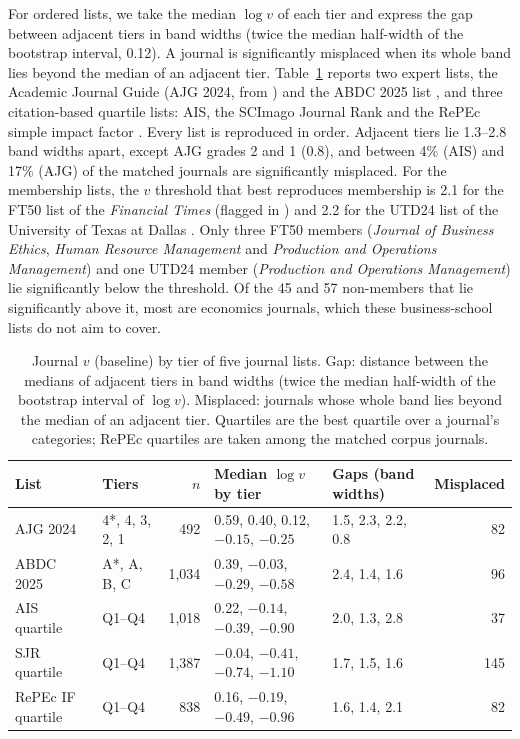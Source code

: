 For ordered lists, we take the median $\log v$ of each tier and express the gap between adjacent tiers in band widths (twice the median half-width of the bootstrap interval, 0.12). A journal is significantly misplaced when its whole band lies beyond the median of an adjacent tier. Table~\ref{tab:journal_tiers} reports two expert lists, the Academic Journal Guide (AJG 2024, from \citealp{harzingJournalQualityList2024}) and the ABDC 2025 list \citep{australianbusinessdeanscouncil2025ABDCJournal2025}, and three citation-based quartile lists: AIS, the SCImago Journal Rank \citep{scimagoSJR2025} and the RePEc simple impact factor \citep{repecRankings2026}. Every list is reproduced in order. Adjacent tiers lie 1.3--2.8 band widths apart, except AJG grades 2 and 1 (0.8), and between 4\% (AIS) and 17\% (AJG) of the matched journals are significantly misplaced. For the membership lists, the $v$ threshold that best reproduces membership is 2.1 for the FT50 list of the \textit{Financial Times} (flagged in \citealp{harzingJournalQualityList2024}) and 2.2 for the UTD24 list of the University of Texas at Dallas \citep{utdTop100}. Only three FT50 members (\textit{Journal of Business Ethics}, \textit{Human Resource Management} and \textit{Production and Operations Management}) and one UTD24 member (\textit{Production and Operations Management}) lie significantly below the threshold. Of the 45 and 57 non-members that lie significantly above it, most are economics journals, which these business-school lists do not aim to cover.

\begin{table}[!htbp]
  \centering
  \small
  \caption{Journal $v$ (baseline) by tier of five journal lists. Gap: distance between the medians of adjacent tiers in band widths (twice the median half-width of the bootstrap interval of $\log v$). Misplaced: journals whose whole band lies beyond the median of an adjacent tier. Quartiles are the best quartile over a journal's categories; RePEc quartiles are taken among the matched corpus journals.}
  \label{tab:journal_tiers}
  \setlength{\tabcolsep}{4pt}
  \begin{tabular}{@{}llrll r@{}}
    \toprule
    List & Tiers & $n$ & Median $\log v$ by tier & Gaps (band widths) & Misplaced \\
    \midrule
    AJG 2024     & 4*, 4, 3, 2, 1 &   492 & 0.59, 0.40, 0.12, $-0.15$, $-0.25$ & 1.5, 2.3, 2.2, 0.8 &  82 \\
    ABDC 2025    & A*, A, B, C    & 1,034 & 0.39, $-0.03$, $-0.29$, $-0.58$    & 2.4, 1.4, 1.6      &  96 \\
    AIS quartile & Q1--Q4         & 1,018 & 0.22, $-0.14$, $-0.39$, $-0.90$    & 2.0, 1.3, 2.8      &  37 \\
    SJR quartile & Q1--Q4         & 1,387 & $-0.04$, $-0.41$, $-0.74$, $-1.10$ & 1.7, 1.5, 1.6      & 145 \\
    RePEc IF quartile & Q1--Q4    &   838 & 0.16, $-0.19$, $-0.49$, $-0.96$    & 1.6, 1.4, 2.1      &  82 \\
    \bottomrule
  \end{tabular}
\end{table}

